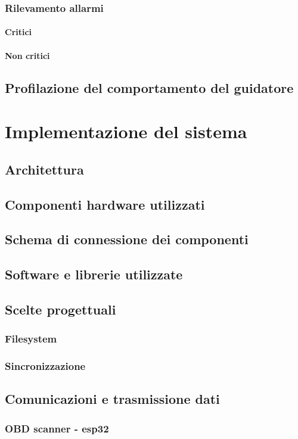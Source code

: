 \documentclass[12pt,a4paper]{report}
\begin{document}
\subsection{Rilevamento allarmi}
\subsubsection{Critici}
\subsubsection{Non critici}
\section{Profilazione del comportamento del guidatore}

\chapter{Implementazione del sistema}
\section{Architettura}
\section{Componenti hardware utilizzati}
\section{Schema di connessione dei componenti}
\section{Software e librerie utilizzate}
\section{Scelte progettuali}
\subsection{Filesystem}
\subsection{Sincronizzazione}
\section{Comunicazioni e trasmissione dati}
\subsection{OBD scanner - esp32}
\end{document}
